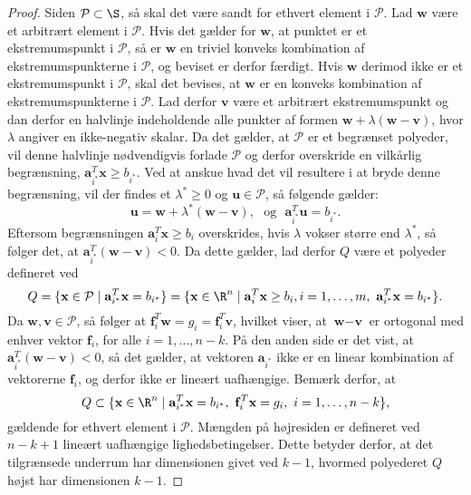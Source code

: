 \begin{proof}
Siden $\mathcal{P} \subset \S$, så skal det være sandt for ethvert element i $\mathcal{P}$.
Lad $\textbf{w}$ være et arbitrært element i $\mathcal{P}$. 
Hvis det gælder for $\textbf{w}$, at punktet er et ekstremumspunkt i $\mathcal{P}$, så er $\textbf{w}$ en triviel konveks kombination af ekstremumspunkterne i $\mathcal{P}$, og beviset er derfor færdigt. 
Hvis $\textbf{w}$ derimod ikke er et ekstremumspunkt i $\mathcal{P}$, skal det bevises, at $\textbf{w}$ er en konveks kombination af ekstremumspunkterne i $\mathcal{P}$. 
Lad derfor $\textbf{v}$ være et arbitrært ekstremumspunkt og dan derfor en halvlinje indeholdende alle punkter af formen $\textbf{w}+\lambda(\textbf{w}-\textbf{v})$, hvor $\lambda$ angiver en ikke-negativ skalar. 
Da det gælder, at $\mathcal{P}$ er et begrænset polyeder, vil denne halvlinje nødvendigvis forlade $\mathcal{P}$ og derfor overskride en vilkårlig begrænsning, $\mathbf{a}_{i^*}^T \textbf{x} \geq b_{i^*}$. 
Ved at anskue hvad det vil resultere i at bryde denne begrænsning, vil der findes et $\lambda^* \geq 0$ og $\textbf{u} \in \mathcal{P}$, så følgende gælder: 
$$\textbf{u}=\textbf{w}+\lambda^* (\textbf{w}-\textbf{v}), \text{     } \text{og} \text{      } \mathbf{a}_{i^*}^T \textbf{u} = b_{i^*}.$$
Eftersom begrænsningen $\mathbf{a}_{i}^{T} \textbf{x} \geq b_i$ overskrides, hvis $\lambda$ vokser større end $\lambda^*$, så følger det, at $\mathbf{a}_{i^*}^{T}(\textbf{w}-\textbf{v}) <0.$ 
Da dette gælder, lad derfor $Q$ være et polyeder defineret ved 
$$Q=\{\textbf{x} \in \mathcal{P} \mid \mathbf{a}_{i^*}^{T} \textbf{x} =b_{i^*}\} = \{\textbf{x} \in \R^n \mid \mathbf{a}_{i}^{T} \textbf{x} \geq b_{i}, i=1,\ldots,m, \text{   } \mathbf{a}_{i^*}^{T} \textbf{x} =b_{i^*}\}.$$
Da $\textbf{w},\textbf{v} \in \mathcal{P}$, så følger at $\mathbf{f}_{i}^{T}\textbf{w}=g_i=\mathbf{f}_{i}^{T}\textbf{v}$, hvilket viser, at $\textbf{w}-\textbf{v}$ er ortogonal med enhver vektor $\mathbf{f}_{i}$, for alle $i=1,\ldots,n-k$. 
På den anden side er det vist, at $\mathbf{a}_{i^*}^{T}(\textbf{w}-\textbf{v}) <0$, så det gælder, at vektoren  $\mathbf{a}_{i^*}$ ikke er en linear kombination af vektorerne $\mathbf{f}_{i}$, og derfor ikke er lineært uafhængige. 
Bemærk derfor, at \\
$$Q \subset \{\textbf{x} \in \R^n \mid \mathbf{a}_{i^*}^{T} \textbf{x}=b_{i^*}, \text{  } \mathbf{f}_{i}^{T}\textbf{x}=g_i, \text{  } i=1,\ldots,n-k\},$$ 
gældende for ethvert element i $\mathcal{P}$. 
Mængden på højresiden er defineret ved $n-k+1$ lineært uafhængige lighedsbetingelser. 
Dette betyder derfor, at det tilgrænsede underrum har dimensionen givet ved $k-1$, hvormed polyederet $Q$ højst har dimensionen $k-1$. 

\end{proof}
